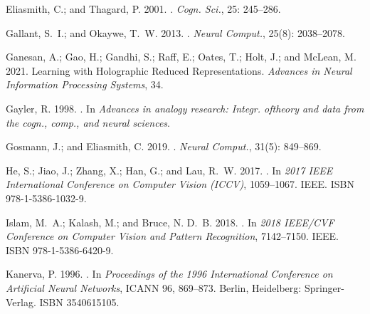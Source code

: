 \documentclass[letterpaper]{article} %
\begin{document}
\begin{thebibliography}{33}
    Eliasmith, C.; and Thagard, P. 2001.
    .
    \newblock \emph{Cogn. Sci.}, 25: 245--286.
    
    Gallant, S.~I.; and Okaywe, T.~W. 2013.
    .
    \newblock \emph{Neural Comput.}, 25(8): 2038–2078.
    
    Ganesan, A.; Gao, H.; Gandhi, S.; Raff, E.; Oates, T.; Holt, J.; and McLean, M.
      2021.
    \newblock Learning with Holographic Reduced Representations.
    \newblock \emph{Advances in Neural Information Processing Systems}, 34.
    
    Gayler, R. 1998.
    .
    \newblock In \emph{Advances in analogy research: Integr. oftheory and data from
      the cogn., comp., and neural sciences}.
    
    Gosmann, J.; and Eliasmith, C. 2019.
    .
    \newblock \emph{Neural Comput.}, 31(5): 849--869.
    
    He, S.; Jiao, J.; Zhang, X.; Han, G.; and Lau, R.~W. 2017.
    .
    \newblock In \emph{2017 IEEE International Conference on Computer Vision
      (ICCV)}, 1059--1067. IEEE.
    \newblock ISBN 978-1-5386-1032-9.
    
    Islam, M.~A.; Kalash, M.; and Bruce, N. D.~B. 2018.
    .
    \newblock In \emph{2018 IEEE/CVF Conference on Computer Vision and Pattern
      Recognition}, 7142--7150. IEEE.
    \newblock ISBN 978-1-5386-6420-9.
    
    Kanerva, P. 1996.
    .
    \newblock In \emph{Proceedings of the 1996 International Conference on
      Artificial Neural Networks}, ICANN 96, 869–873. Berlin, Heidelberg:
      Springer-Verlag.
    \newblock ISBN 3540615105.
    

\end{thebibliography}
\end{document}
